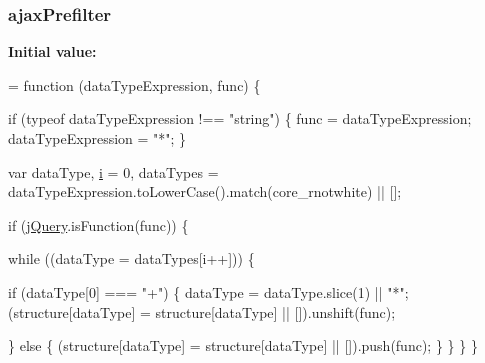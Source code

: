 \subsubsection[{\texorpdfstring{ajax\+Prefilter}{ajaxPrefilter}}]{ ajax\+Prefilter}\hypertarget{jquery-2_82_81-vsdoc_8js_a414ccda111294ca405827d1f416a7512}{}\label{jquery-2_82_81-vsdoc_8js_a414ccda111294ca405827d1f416a7512}
{\bfseries Initial value\+:}
\begin{DoxyCode}
= \textcolor{keyword}{function} (dataTypeExpression, func) \{
        


        \textcolor{keywordflow}{if} (typeof dataTypeExpression !== \textcolor{stringliteral}{"string"}) \{
            func = dataTypeExpression;
            dataTypeExpression = \textcolor{stringliteral}{"*"};
        \}

        var dataType,
            \hyperlink{geolocation-marker_8js_a0325b7ce0988782a8032e720ef3aa411}{i} = 0,
            dataTypes = dataTypeExpression.toLowerCase().match(core\_rnotwhite) || [];

        \textcolor{keywordflow}{if} (\hyperlink{jquery-2_82_81-vsdoc_8js_add5237586d970a38a81f990e8eb28c6c}{jQuery}.isFunction(func)) \{
            
            \textcolor{keywordflow}{while} ((dataType = dataTypes[i++])) \{
                
                \textcolor{keywordflow}{if} (dataType[0] === \textcolor{stringliteral}{"+"}) \{
                    dataType = dataType.slice(1) || \textcolor{stringliteral}{"*"};
                    (structure[dataType] = structure[dataType] || []).unshift(func);

                    
                \} \textcolor{keywordflow}{else} \{
                    (structure[dataType] = structure[dataType] || []).push(func);
                \}
            \}
        \}
    \}
\end{DoxyCode}
